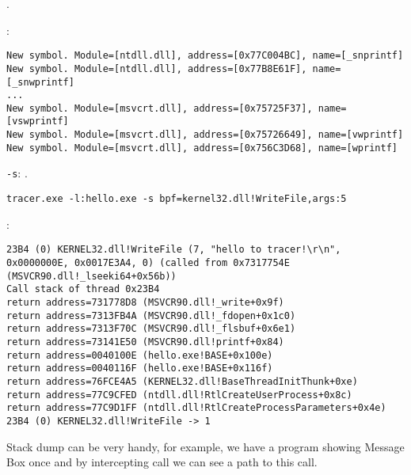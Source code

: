  .

 :

\begin{lstlisting}
New symbol. Module=[ntdll.dll], address=[0x77C004BC], name=[_snprintf]
New symbol. Module=[ntdll.dll], address=[0x77B8E61F], name=[_snwprintf]
...
New symbol. Module=[msvcrt.dll], address=[0x75725F37], name=[vswprintf]
New symbol. Module=[msvcrt.dll], address=[0x75726649], name=[vwprintf]
New symbol. Module=[msvcrt.dll], address=[0x756C3D68], name=[wprintf]
\end{lstlisting}

\verb|-s|: .

\forexample{}

\verb|tracer.exe -l:hello.exe -s bpf=kernel32.dll!WriteFile,args:5|

:

\begin{lstlisting}
23B4 (0) KERNEL32.dll!WriteFile (7, "hello to tracer!\r\n", 0x0000000E, 0x0017E3A4, 0) (called from 0x7317754E (MSVCR90.dll!_lseeki64+0x56b))
Call stack of thread 0x23B4
return address=731778D8 (MSVCR90.dll!_write+0x9f)
return address=7313FB4A (MSVCR90.dll!_fdopen+0x1c0)
return address=7313F70C (MSVCR90.dll!_flsbuf+0x6e1)
return address=73141E50 (MSVCR90.dll!printf+0x84)
return address=0040100E (hello.exe!BASE+0x100e)
return address=0040116F (hello.exe!BASE+0x116f)
return address=76FCE4A5 (KERNEL32.dll!BaseThreadInitThunk+0xe)
return address=77C9CFED (ntdll.dll!RtlCreateUserProcess+0x8c)
return address=77C9D1FF (ntdll.dll!RtlCreateProcessParameters+0x4e)
23B4 (0) KERNEL32.dll!WriteFile -> 1
\end{lstlisting}

{Stack dump can be very handy, for example, we have a program showing Message Box once and by intercepting  call we can see a path to this call.}


